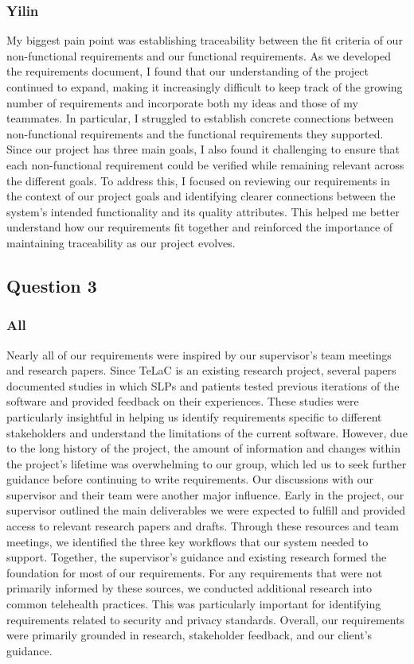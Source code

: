 \documentclass[12pt]{article}
\begin{document}
\subsubsection*{Yilin}
My biggest pain point was establishing traceability between the fit criteria of our non-functional requirements and our functional requirements. As we developed the requirements document, I found that our understanding of the project continued to expand, making it increasingly difficult to keep track of the growing number of requirements and incorporate both my ideas and those of my teammates. In particular, I struggled to establish concrete connections between non-functional requirements and the functional requirements they supported. Since our project has three main goals, I also found it challenging to ensure that each non-functional requirement could be verified while remaining relevant across the different goals. To address this, I focused on reviewing our requirements in the context of our project goals and identifying clearer connections between the system’s intended functionality and its quality attributes. This helped me better understand how our requirements fit together and reinforced the importance of maintaining traceability as our project evolves.

\subsection*{Question 3}
\subsubsection*{All}
Nearly all of our requirements were inspired by our supervisor’s team meetings and research papers. Since TeLaC is an existing research project, several papers documented studies in which SLPs and patients tested previous iterations of the software and provided feedback on their experiences. These studies were particularly insightful in helping us identify requirements specific to different stakeholders and understand the limitations of the current software. However, due to the long history of the project, the amount of information and changes within the project's lifetime was overwhelming to our group, which led us to seek further guidance before continuing to write requirements.
Our discussions with our supervisor and their team were another major influence. Early in the project, our supervisor outlined the main deliverables we were expected to fulfill and provided access to relevant research papers and drafts. Through these resources and team meetings, we identified the three key workflows that our system needed to support. Together, the supervisor’s guidance and existing research formed the foundation for most of our requirements. For any requirements that were not primarily informed by these sources, we conducted additional research into common telehealth practices. This was particularly important for identifying requirements related to security and privacy standards. Overall, our requirements were primarily grounded in research, stakeholder feedback, and our client’s guidance.
\end{document}
